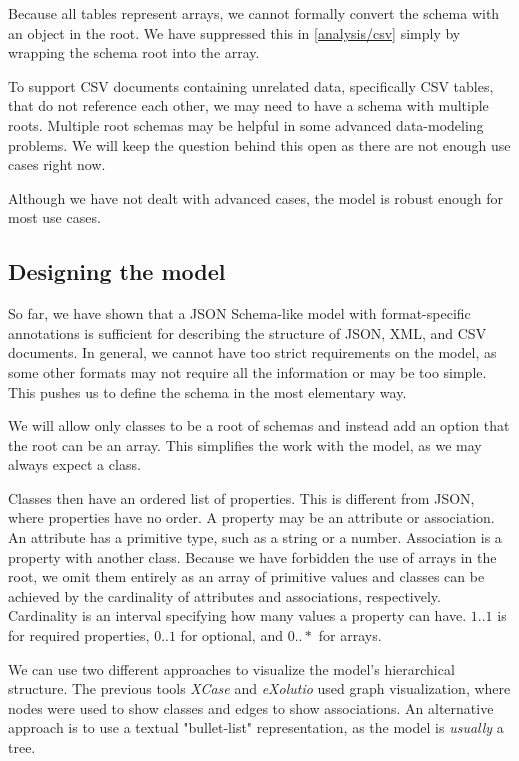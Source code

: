 Because all tables represent arrays, we cannot formally convert the schema with an object in the root. We have suppressed this in \autoref{analysis/csv} simply by wrapping the schema root into the array.

To support CSV documents containing unrelated data, specifically CSV tables, that do not reference each other, we may need to have a schema with multiple roots. Multiple root schemas may be helpful in some advanced data-modeling problems. We will keep the question behind this open as there are not enough use cases right now.

Although we have not dealt with advanced cases, the model is robust enough for most use cases.

\subsection{Designing the model}

So far, we have shown that a JSON Schema-like model with format-specific annotations is sufficient for describing the structure of JSON, XML, and CSV documents. In general, we cannot have too strict requirements on the model, as some other formats may not require all the information or may be too simple. This pushes us to define the schema in the most elementary way.

\medskip

We will allow only classes to be a root of schemas and instead add an option that the root can be an array. This simplifies the work with the model, as we may always expect a class.

Classes then have an ordered list of properties. This is different from JSON, where properties have no order. A property may be an attribute or association. An attribute has a primitive type, such as a string or a number. Association is a property with another class. Because we have forbidden the use of arrays in the root, we omit them entirely as an array of primitive values and classes can be achieved by the cardinality of attributes and associations, respectively. Cardinality is an interval specifying how many values a property can have. $1..1$ is for required properties, $0..1$ for optional, and $0..*$ for arrays.

\smallskip

We can use two different approaches to visualize the model's hierarchical structure. The previous tools \textit{XCase} and \textit{eXolutio} used graph visualization, where nodes were used to show classes and edges to show associations. An alternative approach is to use a textual "bullet-list" representation, as the model is \textit{usually} a tree.

